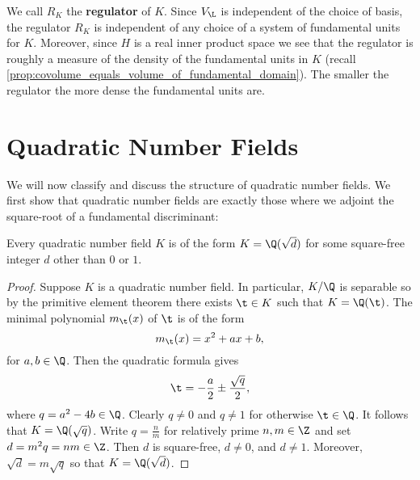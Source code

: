       We call $R_{K}$ the \textbf{regulator} of $K$. Since $V_{\L}$ is independent of the choice of basis, the regulator $R_{K}$ is independent of any choice of a system of fundamental units for $K$. Moreover, since $H$ is a real inner product space we see that the regulator is roughly a measure of the density of the fundamental units in $K$ (recall \cref{prop:covolume_equals_volume_of_fundamental_domain}). The smaller the regulator the more dense the fundamental units are.
  \section{Quadratic Number Fields}
    We will now classify and discuss the structure of quadratic number fields. We first show that quadratic number fields are exactly those where we adjoint the square-root of a fundamental discriminant:

    \begin{proposition}\label{prop:classification_of_quadratic_number_fields}
      Every quadratic number field $K$ is of the form $K = \Q(\sqrt{d})$ for some square-free integer $d$ other than $0$ or $1$.
    \end{proposition}
    \begin{proof}
      Suppose $K$ is a quadratic number field. In particular, $K/\Q$ is separable so by the primitive element theorem there exists $\t \in K$ such that $K = \Q(\t)$. The minimal polynomial $m_{\t}(x)$ of $\t$ is of the form
      \[
        m_{\t}(x) = x^{2}+ax+b,
      \]
      for $a,b \in \Q$. Then the quadratic formula gives
      \[
        \t = -\frac{a}{2}\pm\frac{\sqrt{q}}{2},
      \]
      where $q = a^{2}-4b \in \Q$. Clearly $q \neq 0$ and $q \neq 1$ for otherwise $\t \in \Q$. It follows that $K = \Q(\sqrt{q})$. Write $q = \frac{n}{m}$ for relatively prime $n,m \in \Z$ and set $d = m^{2}q = nm \in \Z$. Then $d$ is square-free, $d \neq 0$, and $d \neq 1$. Moreover, $\sqrt{d} = m\sqrt{q}$ so that $K = \Q(\sqrt{d})$. 
    \end{proof}

